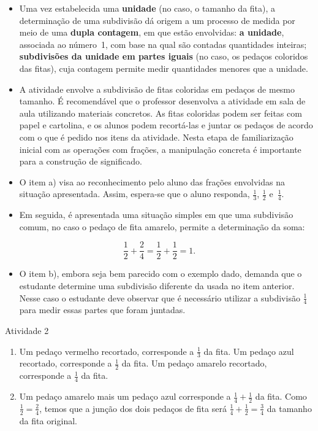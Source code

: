 \begin{multicols}{2}
\begin{itemize} %
    \item       Uma vez estabelecida uma       {\bf unidade}       (no caso, o tamanho da fita), a determinação de uma subdivisão dá origem a um processo de medida por meio de uma       {\bf dupla contagem}, em que estão envolvidas:       {\bf a unidade}, associada ao número~1, com base na qual são contadas quantidades inteiras;       {\bf subdivisões da unidade em partes iguais}       (no caso, os pedaços coloridos das fitas), cuja contagem permite medir quantidades menores que a unidade.
    \item       A atividade envolve a subdivisão de fitas coloridas em pedaços de mesmo tamanho. É recomendável que o professor desenvolva a atividade em sala de aula utilizando materiais concretos. As fitas coloridas podem ser feitas com papel e cartolina, e os alunos podem recortá-las e juntar os pedaços de acordo com o que é pedido nos itens da atividade. Nesta etapa de familiarização inicial com as operações com frações, a manipulação concreta é importante para a construção de significado.
    \item       O item a) visa ao reconhecimento pelo aluno das frações envolvidas na situação apresentada. Assim, espera-se que o aluno responda,       $\frac{1}{3}$,       $\frac{1}{2}$       e~$\frac{1}{4}$.
    \item       Em seguida, é apresentada uma situação simples em que uma subdivisão comum, no caso o pedaço de fita amarelo, permite a determinação da soma:
\end{itemize} %

  $$ \frac{1}{2} + \frac{2}{4} = \frac{1}{2} + \frac{1}{2} = 1.$$
\begin{itemize} %
    \item       O item b), embora seja bem parecido com o exemplo dado, demanda que o estudante determine uma subdivisão diferente da usada no item anterior. Nesse caso o estudante deve observar que é necessário utilizar a subdivisão       $\frac{1}{4}$       para medir essas partes que foram juntadas.
\end{itemize} %


\begin{resposta*}{Atividade 2}
\begin{enumerate} [\quad a)] %
    \item       Um pedaço vermelho recortado, corresponde a       $\frac{1}{3}$       da fita.       \mbox{} \newline        Um pedaço azul recortado, corresponde a       $\frac{1}{2}$       da fita.       \mbox{} \newline        Um pedaço amarelo recortado, corresponde a       $\frac{1}{4}$       da fita.
    \item       Um pedaço amarelo mais um pedaço azul corresponde a       $\frac{1}{4} +\frac{1}{2}$       da fita. Como       $\frac{1}{2} =\frac{2}{4}$, temos que a junção dos dois pedaços de fita será       $\frac{1}{4} +\frac{1}{2} = \frac{3}{4}$       da tamanho da fita original.
\end{enumerate} %



\end{resposta*}
\end{multicols}
